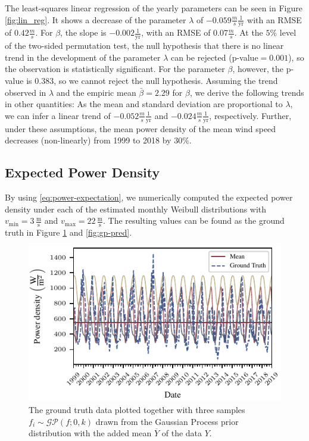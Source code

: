 \documentclass{article}
\theoremstyle{plain}
\theoremstyle{definition}
\theoremstyle{remark}
\begin{document}
The least-squares linear regression of the yearly parameters can be seen in Figure
\ref{fig:lin_reg}.  It shows a decrease of the parameter $\lambda$ of $-0.059\frac{m}{s}
\frac{1}{\mathrm{yr}}$ with an RMSE of $0.42\frac{m}{s}$.  For $\beta$, the slope is $-0.002
\frac{1}{\mathrm{yr}}$, with an RMSE of $0.07  \frac{m}{s}$.  At the $5\%$ level of the two-sided
permutation test, the null hypothesis that there is no linear trend in the development of the
parameter $\lambda$ can be rejected (p-value$=0.001$), so the observation is statistically
significant.  For the parameter $\beta$, however, the p-value is $0.383$, so we cannot reject the
null hypothesis.  Assuming the trend observed in $\lambda$ and the empiric mean $\bar \beta=2.29$
for $\beta$, we derive the following trends in other quantities: As the mean  and standard deviation
are proportional to $ \lambda$, we can infer a linear trend of $-0.052 \frac{m}{s}
\frac{1}{\mathrm{yr}}$ and  $-0.024 \frac{m}{s} \frac{1}{\mathrm{yr}}$, respectively.
Further, under these assumptions, the mean power density of the mean wind speed decreases
(non-linearly) from 1999 to 2018 by $30\%$.

\subsection{Expected Power Density}

By using \eqref{eq:power-expectation}, we numerically computed the expected power density under each
of the estimated monthly Weibull distributions with $v_\mathrm{min} = 3 \,
\frac{\mathrm{m}}{\mathrm{s}}$ and $v_\mathrm{max} = 22 \, \frac{\mathrm{m}}{\mathrm{s}}$. The
resulting values can be found as the ground truth in Figure \ref{fig:gp-samples} and
\ref{fig:gp-pred}.

\begin{figure}
    \centering
    \includegraphics{fig/gp_samples.pdf}
    \caption{The \textcolor{TUdarkblue}{ground truth} data plotted together with three samples $f_i \sim \mathcal{GP}(f; 0, k)$ drawn from the Gaussian Process prior distribution with the added \textcolor{TUred}{mean} $\overline{Y}$ of the data $Y$.}
    \label{fig:gp-samples}
\end{figure}
\end{document}

